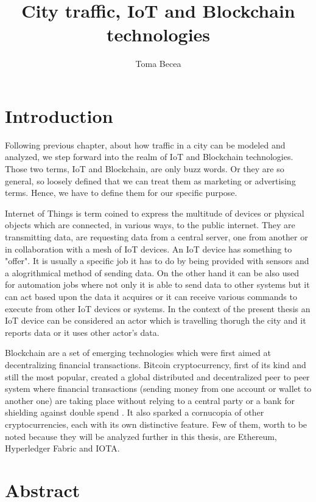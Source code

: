 \documentclass[a4paper,12pt,twoside]{book}
\title{ City traffic, IoT and Blockchain technologies }
\author{Toma Becea}
\begin{document}
\maketitle

\clearpage

\section{Introduction}

    Following previous chapter, about how traffic in a city can be modeled and analyzed, we step forward into the realm of IoT and Blockchain technologies. Those two terms, IoT and Blockchain, are only buzz words. Or they are so general, so loosely defined that we can treat them as marketing or advertising terms. Hence, we have to define them for our specific purpose.

    Internet of Things is term coined to express the multitude of devices or physical objects which are connected, in various ways, to the public internet. They are transmitting data, are requesting data from a central server, one from another or in collaboration with a mesh of IoT devices. An IoT device has something to "offer". It is usually a specific job it has to do by being provided with sensors and a alogrithmical method of sending data. On the other hand it can be also used for automation jobs where not only it is able to send data to other systems but it can act based upon the data it acquires or it can receive various commands to execute from other IoT devices or systems. In the context of the present thesis an IoT device can be considered an actor which is travelling thorugh the city and it reports data or it uses other actor's data.

    Blockchain are a set of emerging technologies which were first aimed at decentralizing financial transactions. Bitcoin cryptocurrency\citep{SatoshiNakamoto}, first of its kind and still the most popular, created a global distributed and decentralized peer to peer system where financial transactions (sending money from one account or wallet to another one) are taking place without relying to a central party or a bank for shielding against double spend \citep{DoubleSpend}. It also sparked a cornucopia of other cryptocurrencies, each with its own distinctive feature. Few of them, worth to be noted because they will be analyzed further in this thesis, are Ethereum, Hyperledger Fabric and IOTA.

\section{Abstract}
\end{document}
